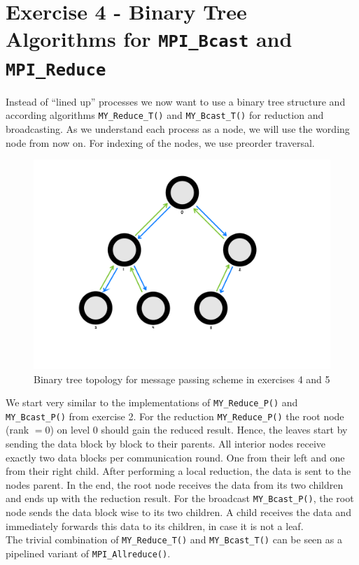 \section{Exercise 4 - Binary Tree Algorithms for \texttt{MPI\_Bcast} and \texttt{MPI\_Reduce}}

Instead of “lined up” processes we now want to use a binary tree structure and according algorithms 
\texttt{MY\_Reduce\_T()} and \texttt{MY\_Bcast\_T()} for reduction and broadcasting. As we understand 
each process as a node, we will use the wording node from now on. For indexing of the nodes, we use preorder traversal.

\begin{figure}[h]
    \begin{center}
        \includegraphics[width=0.6\linewidth]{figures/sketch_tree.pdf}
        \caption{Binary tree topology for message passing scheme in exercises 4 and 5}
        \label{Ex4_sketch_p}
    \end{center}
\end{figure}

We start very similar to the implementations of \texttt{MY\_Reduce\_P()} and \texttt{MY\_Bcast\_P()} 
from exercise 2. For the reduction \texttt{MY\_Reduce\_P()}  the root node (rank $=0$) on level 0 should 
gain the reduced result. Hence, the leaves start by sending the data block by block to their parents. All 
interior nodes receive exactly two data blocks per communication round. One from their left and one from their 
right child. After performing a local reduction, the data is sent to the nodes parent. In the end, the root 
node receives the data from its two children and ends up with the reduction result. For the broadcast 
\texttt{MY\_Bcast\_P()}, the root node sends the data block wise to its two children. A child receives 
the data and immediately forwards this data to its children, in case it is not a leaf.\\

The trivial combination of \texttt{MY\_Reduce\_T()} and \texttt{MY\_Bcast\_T()} can be seen 
as a pipelined variant of \texttt{MPI\_Allreduce()}.\\

